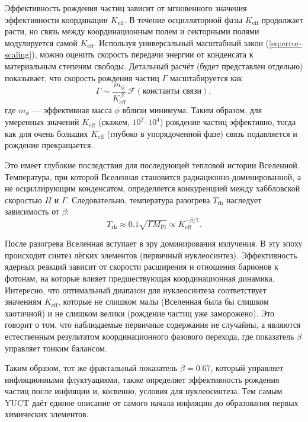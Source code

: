 \documentclass[11pt,a4paper]{article}
\newcommand{\Keff}{K_{\mathrm{eff}}}
\begin{document}
	Эффективность рождения частиц зависит от мгновенного значения эффективности координации \(\Keff\). В течение осцилляторной фазы \(\Keff\) продолжает расти, но связь между координационным полем и секторными полями модулируется самой \(\Keff\). Используя универсальный масштабный закон (\ref{eq:error-scaling}), можно оценить скорость передачи энергии от конденсата к материальным степеням свободы. Детальный расчёт (будет представлен отдельно) показывает, что скорость рождения частиц \(\Gamma\) масштабируется как
	\begin{equation}
		\Gamma \sim \frac{m_\phi}{\Keff^{\,\beta}} \, \mathcal{F}(\text{константы связи}),
		\label{eq:gamma}
	\end{equation}
	где \(m_\phi\) — эффективная масса \(\phi\) вблизи минимума. Таким образом, для умеренных значений \(\Keff\) (скажем, \(10^2\)–\(10^4\)) рождение частиц эффективно, тогда как для очень больших \(\Keff\) (глубоко в упорядоченной фазе) связь подавляется и рождение прекращается.
	
	Это имеет глубокие последствия для последующей тепловой истории Вселенной. Температура, при которой Вселенная становится радиационно-доминированной, а не осциллирующим конденсатом, определяется конкуренцией между хаббловской скоростью \(H\) и \(\Gamma\). Следовательно, температура разогрева \(T_{\mathrm{rh}}\) наследует зависимость от \(\beta\):
	\begin{equation}
		T_{\mathrm{rh}} \approx 0.1 \sqrt{\Gamma M_{\mathrm{Pl}}} \propto \Keff^{-\beta/2}.
		\label{eq:trh}
	\end{equation}
	
	После разогрева Вселенная вступает в эру доминирования излучения. В эту эпоху происходит синтез лёгких элементов (первичный нуклеосинтез). Эффективность ядерных реакций зависит от скорости расширения и отношения барионов к фотонам, на которые влияет предшествующая координационная динамика. Интересно, что оптимальный диапазон для нуклеосинтеза соответствует значениям \(\Keff\), которые не слишком малы (Вселенная была бы слишком хаотичной) и не слишком велики (рождение частиц уже заморожено). Это говорит о том, что наблюдаемые первичные содержания не случайны, а являются естественным результатом координационного фазового перехода, где показатель \(\beta\) управляет тонким балансом.
	
	Таким образом, тот же фрактальный показатель \(\beta = 0.67\), который управляет инфляционными флуктуациями, также определяет эффективность рождения частиц после инфляции и, косвенно, условия для нуклеосинтеза. Тем самым YUCT даёт единое описание от самого начала инфляции до образования первых химических элементов.
	
\end{document}
